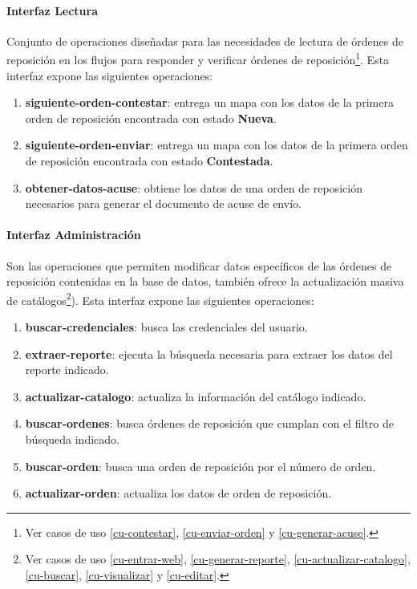 \paragraph{Interfaz Lectura\\}
Conjunto de operaciones diseñadas para las necesidades de lectura de órdenes de reposición en los flujos para responder y verificar órdenes de reposición\footnote{Ver casos de uso \ref{cu-contestar}, \ref{cu-enviar-orden} y \ref{cu-generar-acuse}.}. Esta interfaz expone las siguientes operaciones:
\begin{enumerate}
	\item \textbf{siguiente-orden-contestar}: entrega un mapa con los datos de la primera orden de reposición encontrada con estado \textbf{Nueva}.
	\item \textbf{siguiente-orden-enviar}: entrega un mapa con los datos de la primera orden de reposición encontrada con estado \textbf{Contestada}.
	\item \textbf{obtener-datos-acuse}: obtiene los datos de una orden de reposición necesarios para generar el documento de acuse de envío.
\end{enumerate}

\paragraph{Interfaz Administración\\}
Son las operaciones que permiten modificar datos específicos de las órdenes de reposición contenidas en la base de datos, también ofrece la actualización masiva de catálogos\footnote{Ver casos de uso \ref{cu-entrar-web}, \ref{cu-generar-reporte}, \ref{cu-actualizar-catalogo}, \ref{cu-buscar}, \ref{cu-visualizar} y \ref{cu-editar}.}). Esta interfaz expone las siguientes operaciones:
\begin{enumerate}
	\item \textbf{buscar-credenciales}: busca las credenciales del usuario.
	\item \textbf{extraer-reporte}: ejecuta la búsqueda necesaria para extraer los datos del reporte indicado.
	\item \textbf{actualizar-catalogo}: actualiza la información del catálogo indicado.
	\item \textbf{buscar-ordenes}: busca órdenes de reposición que cumplan con el filtro de búsqueda indicado.
	\item \textbf{buscar-orden}: busca una orden de reposición por el número de orden.
	\item \textbf{actualizar-orden}: actualiza los datos de orden de reposición.
\end{enumerate}

